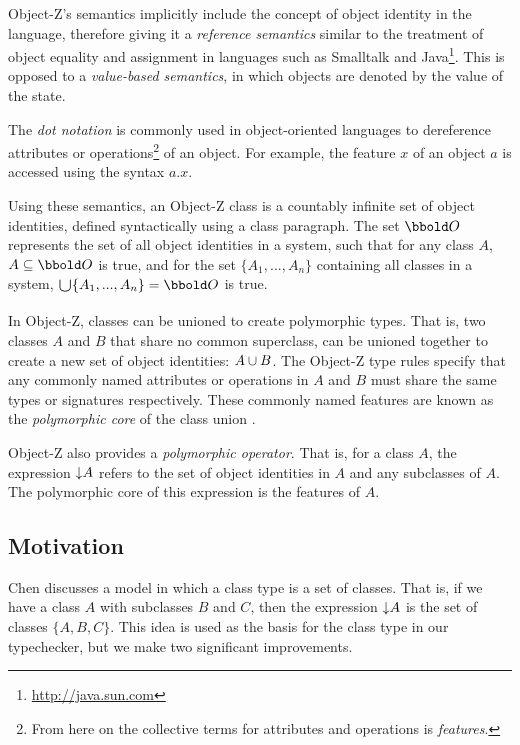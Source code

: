 Object-Z's semantics implicitly include the concept of object identity
in the language, therefore giving it a {\em reference semantics}
similar to the treatment of object equality and assignment in
languages such as Smalltalk \cite{goldberg83} and
Java\footnote{\url{http://java.sun.com}}. This is opposed to a {\em
value-based semantics}, in which objects are denoted by the value of
the state.

The {\em dot notation} is commonly used in object-oriented languages
to dereference attributes or operations\footnote{From here on
the collective terms for attributes and operations is {\em features}.}
of an object. For example, the feature $x$ of an object $a$ is
accessed using the syntax $a.x$.

Using these semantics, an Object-Z class is a countably infinite set
of object identities, defined syntactically using a class
paragraph. The set $\oid$ represents the set of all object identities
in a system, such that for any class $A$, $A \subseteq \oid$ is true,
and for the set $\{ A_{1}, ..., A_{n} \}$ containing all classes in a
system, $\duni \{ A_{1}, ..., A_{n} \} = \oid$ is true.

In Object-Z, classes can be unioned to create polymorphic types. That
is, two classes $A$ and $B$ that share no common superclass, can be
unioned together to create a new set of object identities: $A
\classuni B$. The Object-Z type rules specify that any commonly named
attributes or operations in $A$ and $B$ must share the same types or
signatures respectively. These commonly named features are known as
the {\em polymorphic core} of the class union \cite{dong93}.

Object-Z also provides a {\em polymorphic operator}. That is, for a
class $A$, the expression $\mathord\downarrow A$ refers to the set of object
identities in $A$ and any subclasses of $A$. The polymorphic core of
this expression is the features of $A$.

\subsection{Motivation}

Chen \cite{chen94} discusses a model in which a class type is a set of
classes. That is, if we have a class $A$ with subclasses $B$ and $C$,
then the expression $\mathord\downarrow A$ is the set of classes $\{A, B,
C\}$. This idea is used as the basis for the class type in our
typechecker, but we make two significant improvements.

